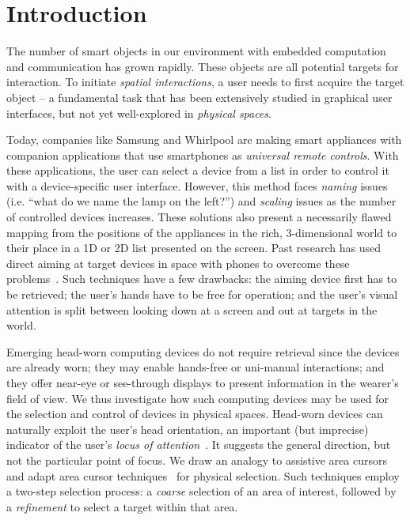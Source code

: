 \vfill
\section{Introduction}

The number of smart objects in our environment with embedded computation and communication has grown rapidly. These objects are all potential targets for interaction. To initiate {\em spatial interactions}, a user needs to first acquire the target object -- a fundamental task that has been extensively studied in graphical user interfaces, but not yet well-explored in {\em physical spaces}.

Today, companies like Samsung and Whirlpool are making smart appliances with companion applications that use smartphones as {\em universal remote controls}. With these applications, the user can select a device from a list in order to control it with a device-specific user interface. However, this method faces {\em naming} issues (i.e. ``what do we name the lamp on the left?'') and {\em scaling} issues as the number of controlled devices increases. These solutions also present a necessarily flawed mapping from the positions of the appliances in the rich, 3-dimensional world to their place in a 1D or 2D list presented on the screen.
%
Past research has used direct aiming at target devices in space with phones to overcome these problems~\cite{beigl_point_1999,patel_2-way_2003}. Such techniques have a few drawbacks: the aiming device first has to be retrieved; the user's hands have to be free for operation; and the user's visual attention is split between looking down at a screen and out at targets in the world.

Emerging head-worn computing devices do not require retrieval since the devices are already worn; they may enable hands-free or uni-manual interactions; and they offer near-eye or see-through displays to present information in the wearer's field of view. We thus investigate how such computing devices may be used for the selection and control of devices in physical spaces. Head-worn devices can naturally exploit the user's head orientation, an important (but imprecise) indicator of the user's {\em locus of attention}~\cite{raskin}. It suggests the general direction, but not the particular point of focus. We draw an analogy to assistive area cursors and adapt area cursor techniques~\cite{kabbash1995prince,worden1997making,findlater2010enhanced} for physical selection. Such techniques employ a two-step selection process: a {\em coarse} selection of an area of interest, followed by a {\em refinement} to select a target within that area.


